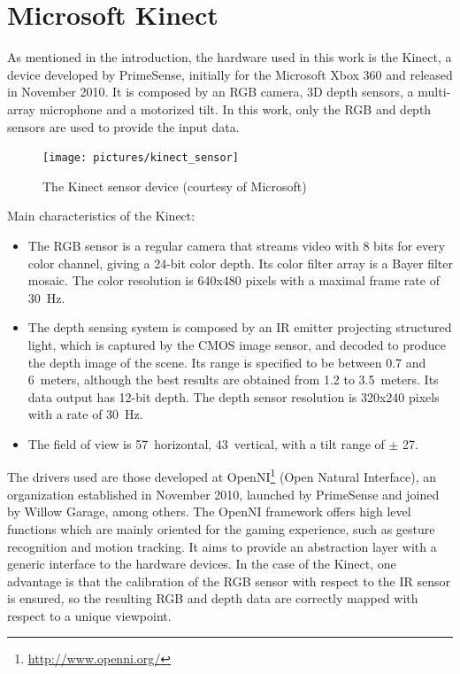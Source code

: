 \section{Microsoft Kinect}

As mentioned in the introduction, the hardware used in this work is the Kinect, a device developed by PrimeSense, initially for the Microsoft Xbox 360 and released in November 2010. It is composed by an RGB camera, 3D depth sensors, a multi-array microphone and a motorized tilt. In this work, only the RGB and depth sensors are used to provide the input data.

\begin{figure}[H]
\centering
\texttt{[image: pictures/kinect\_sensor]}
\caption{The Kinect sensor device (courtesy of Microsoft)}
\end{figure}

Main characteristics of the Kinect:
\begin{itemize}
 \item The RGB sensor is a regular camera that streams video with 8 bits for every color channel, giving a 24-bit color depth. Its  color filter array is a Bayer filter mosaic. The color resolution is 640x480 pixels with a maximal frame rate of 30~Hz.
 \item The depth sensing system is composed by an IR emitter projecting structured light, which is captured by the CMOS image sensor, and decoded to produce the depth image of the scene. Its range is specified to be between 0.7 and 6~meters, although the best results are obtained from 1.2 to 3.5~meters. Its data output has 12-bit depth. The depth sensor resolution is 320x240 pixels with a rate of 30~Hz.
 \item The field of view is 57\textdegree ~horizontal, 43\textdegree ~vertical, with a tilt range of $\pm$ 27\textdegree.
\end{itemize}

The drivers used are those developed at OpenNI\footnote{\url{http://www.openni.org/}} (Open Natural Interface), an organization established in November 2010, launched by PrimeSense and joined by Willow Garage, among others. The OpenNI framework offers high level functions which are mainly oriented for the gaming experience, such as gesture recognition and motion tracking. It aims to provide an abstraction layer with a generic interface to the hardware devices. In the case of the Kinect, one advantage is that the calibration of the RGB sensor with respect to the IR sensor is ensured, so the resulting RGB and depth data are correctly mapped with respect to a unique viewpoint.


